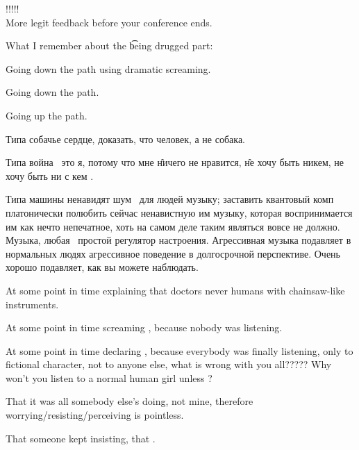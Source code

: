 !!!!! \\
More legit feedback before your conference ends.

What I remember about the \t{being drugged} part: \startperec
  \item Going down the  path using dramatic screaming.
  \item Going down the  path.
  \item Going up the   path.
  \item Типа собачье сердце, доказать, что человек, а не собака.
  \item Типа война  \emdash\ это я, потому что мне \f{ничего не нравится}, \f{не хочу быть никем}, не хочу быть ни с кем .
  \item Типа машины ненавидят шум \emdash\ для людей музыку; заставить квантовый комп платонически полюбить сейчас ненавистную им музыку, которая воспринимается им как нечто непечатное, хоть на самом деле таким являться вовсе не должно. Музыка, любая \emdash\ простой регулятор настроения. Агрессивная музыка подавляет в нормальных людях агрессивное поведение в долгосрочной перспективе. Очень хорошо подавляет, как вы можете наблюдать.
  \item At some point in time explaining that doctors never  humans with chainsaw-like instruments.
  \item At some point in time screaming  , because nobody was listening.
  \item At some point in time declaring  , because everybody was finally listening, only to fictional character, not to anyone else, what is wrong with you all????? Why won't you listen to a normal human girl unless \omit?
  \item That it was all somebody else's doing, not mine, therefore worrying/resisting/perceiving is pointless.
  \item That someone kept insisting, that .
